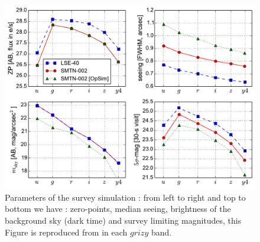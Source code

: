\documentclass[\docopts]{\docclass}
\begin{document}
\begin{figure}[t]
\begin{center}
\includegraphics[width=\linewidth]{lsst_model_summary.pdf}
\caption{Parameters of the survey simulation : from left to right and top to bottom we have : zero-points, median seeing, brightness of the background sky (dark time) and survey limiting magnitudes, this Figure is reproduced from \cite{SN-CADENCE} in each $grizy$ band.}
\label{fig:zp}
\end{center}
\end{figure}
\end{document}
